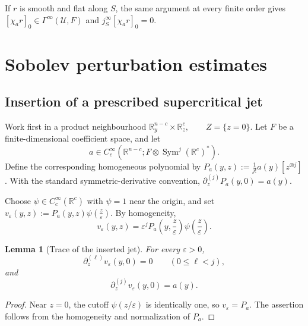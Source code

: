 \documentclass[11pt]{article}
\theoremstyle{plain}
\newtheorem{lemma}[theorem]{Lemma}
\theoremstyle{definition}
\begin{document}
If \(r\) is smooth and flat along \(S\), the same argument at every
finite order gives \([\chi_ar]_0 \in \Gamma^\infty(\mathcal U,F)\) and
\(j_S^\infty[\chi_ar]_0=0\).

\section{Sobolev perturbation estimates}
\label{app:sobolev-perturbations}



\subsection{Insertion of a prescribed supercritical jet}
\label{appsubsec:supercritical-insertion}

Work first in a product neighbourhood
\(\mathbb R^{n-c}_y \times \mathbb R^c_z, \qquad Z=\{z=0\}\).
Let \(F\) be a finite-dimensional coefficient space, and let
\[
  a
  \in
  C_c^\infty
  \left(
    \mathbb R^{n-c};
    F\otimes
    \operatorname{Sym}^j(\mathbb R^c)^*
  \right).
\]
Define the corresponding homogeneous polynomial by
\(P_a(y,z) := \frac{1}{j!} a(y) \left[ z^{\otimes j} \right]\).
With the standard symmetric-derivative convention,
\(\partial_z^{(j)}P_a(y,0)=a(y)\).

Choose \(\psi\in C_c^\infty(\mathbb R^c)\) with \(\psi=1\) near the origin, and set
\(v_\varepsilon(y,z) := P_a(y,z) \psi \left( \frac{z}{\varepsilon} \right)\).
By homogeneity,
\[
  v_\varepsilon(y,z)
  =
  \varepsilon^j
  P_a
  \left(
    y,\frac{z}{\varepsilon}
  \right)
  \psi
  \left(
    \frac{z}{\varepsilon}
  \right).
\]

\begin{lemma}[Trace of the inserted jet]
\label{lem:trace-inserted-jet}
For every \(\varepsilon>0\),
\[
  \partial_z^{(\ell)}
  v_\varepsilon(y,0)
  =
  0
  \qquad
  (0\leq\ell<j),
\]
and
\[
  \partial_z^{(j)}
  v_\varepsilon(y,0)
  =
  a(y).
\]
\end{lemma}

\begin{proof}
Near \(z=0\), the cutoff \(\psi(z/\varepsilon)\) is identically one,
so
\(v_\varepsilon=P_a\).
The assertion follows from the homogeneity and normalization of
\(P_a\).
\end{proof}
\end{document}

